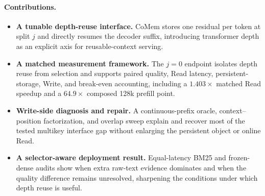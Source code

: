 \paragraph{Contributions.}
\begin{itemize}[leftmargin=1.2em,itemsep=1pt,topsep=2pt]
\item \textbf{A tunable depth-reuse interface.} CoMem stores one residual per
token at split $j$ and directly resumes the decoder suffix, introducing
transformer depth as an explicit axis for reusable-context serving.
\item \textbf{A matched measurement framework.} The $j{=}0$ endpoint isolates
depth reuse from selection and supports paired quality, Read latency,
persistent-storage, Write, and break-even accounting, including a
$1.403\times$ matched Read speedup and a $64.9\times$ composed 128k prefill
point.
\item \textbf{Write-side diagnosis and repair.} A continuous-prefix oracle,
context--position factorization, and overlap sweep explain and recover most of
the tested multikey interface gap without enlarging the persistent object or
online Read.
\item \textbf{A selector-aware deployment result.} Equal-latency BM25 and
frozen-dense audits show when extra raw-text evidence dominates and when the
quality difference remains unresolved, sharpening the conditions under which
depth reuse is useful.
\end{itemize}
